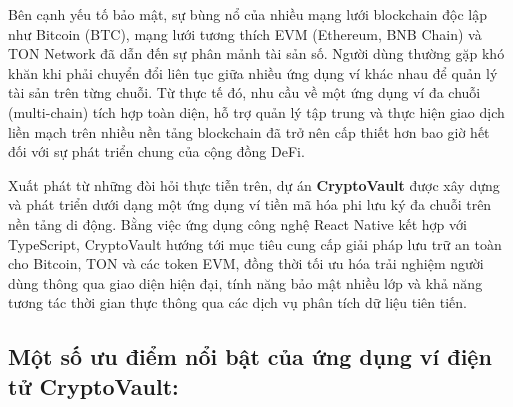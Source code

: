 \documentclass[a4paper]{report}
\begin{document}
Bên cạnh yếu tố bảo mật, sự bùng nổ của nhiều mạng lưới blockchain độc lập như Bitcoin (BTC), mạng lưới tương thích EVM (Ethereum, BNB Chain) và TON Network đã dẫn đến sự phân mảnh tài sản số. Người dùng thường gặp khó khăn khi phải chuyển đổi liên tục giữa nhiều ứng dụng ví khác nhau để quản lý tài sản trên từng chuỗi. Từ thực tế đó, nhu cầu về một ứng dụng ví đa chuỗi (multi-chain) tích hợp toàn diện, hỗ trợ quản lý tập trung và thực hiện giao dịch liền mạch trên nhiều nền tảng blockchain đã trở nên cấp thiết hơn bao giờ hết đối với sự phát triển chung của cộng đồng DeFi.

Xuất phát từ những đòi hỏi thực tiễn trên, dự án \textbf{CryptoVault} được xây dựng và phát triển dưới dạng một ứng dụng ví tiền mã hóa phi lưu ký đa chuỗi trên nền tảng di động. Bằng việc ứng dụng công nghệ React Native kết hợp với TypeScript, CryptoVault hướng tới mục tiêu cung cấp giải pháp lưu trữ an toàn cho Bitcoin, TON và các token EVM, đồng thời tối ưu hóa trải nghiệm người dùng thông qua giao diện hiện đại, tính năng bảo mật nhiều lớp và khả năng tương tác thời gian thực thông qua các dịch vụ phân tích dữ liệu tiên tiến.

\subsection{Một số ưu điểm nổi bật của ứng dụng ví điện tử CryptoVault:}
\end{document}
